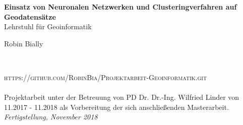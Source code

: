 \documentclass[11pt,fleqn]{book}
\begin{document}

\begingroup
\thispagestyle{empty}
\centering
\vspace*{5cm}
\par\normalfont\fontsize{35}{35}\sffamily\selectfont
\textbf{{\color{white} Einsatz von Neuronalen Netzwerken und Clusteringverfahren auf Geodatensätze}}\\
{\LARGE {\color{white}Lehrstuhl für Geoinformatik}}\par
\vspace*{1cm}
{\Huge {\color{white} Robin Bially}}\par 
\endgroup


\newpage
~\vfill
\thispagestyle{empty}

\noindent \textsc{https://github.com/RobinBia/Projektarbeit-Geoinformatik.git}\\ \\ %

\noindent Projektarbeit unter der Betreuung von PD Dr. Dr.-Ing. Wilfried Linder von 11.2017 - 11.2018 als Vorbereitung der sich anschließenden Masterarbeit.\\ %

\noindent \textit{Fertigstellung, November 2018} 


\raggedright


\pagestyle{empty} %

\tableofcontents %


\pagestyle{fancy} %


\end{document}
